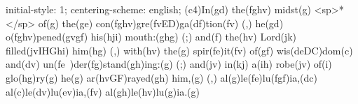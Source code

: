 initial-style: 1;
centering-scheme: english;
(c4)In(gd) the(fghv) midst(g) <sp>*</sp> of(g) the(ge) con(fghv)gre(fvED)ga(df)tion(fv) (,) he(gd) o(fghv)pened(gvgf) his(hji) mouth:(ghg) (;) and(f) the(hv) Lord(jk) filled(jvIHGhi) him(hg) (,) with(hv) the(g) spir(fe)it(fv) of(gf) wis(deDC)dom(c) and(dv) un(fe~)der(fg)stand(gh)ing:(g) (;) and(jv) in(kj) a(ih) robe(jv) of(i) glo(hg)ry(g) he(g) ar(hvGF)rayed(gh) him,(g) (,) al(g)le(fe)lu(fgf)ia,(dc) al(c)le(dv)lu(ev)ia,(fv) al(gh)le(hv)lu(g)ia.(g)
